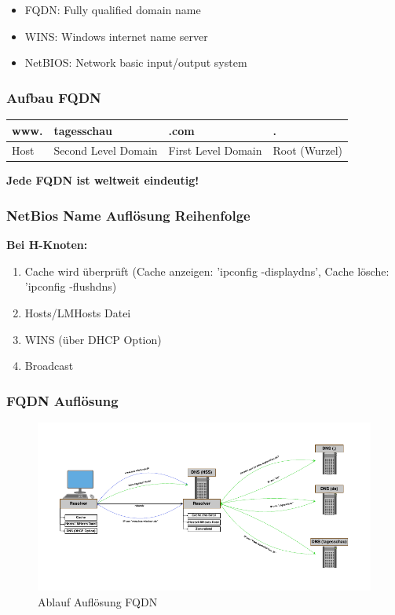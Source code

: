\documentclass[10pt]{article}
\begin{document}
\begin{itemize}
    \item FQDN: Fully qualified domain name
    \item WINS: Windows internet name server
    \item NetBIOS: Network basic input/output system
\end{itemize}

\subsubsection{Aufbau FQDN}

\begin{table}[H]
    \centering
    \begin{tabular}{|l|l|l|l|}
         \hline
         www.&tagesschau&.com&.\\\hline
         Host&Second Level Domain& First Level Domain & Root (Wurzel)\\\hline
    \end{tabular}
\end{table}

\textbf{Jede FQDN ist weltweit eindeutig!}

\subsubsection{NetBios Name Auflösung Reihenfolge}
\textbf{Bei H-Knoten:}
\begin{enumerate}
        \item Cache wird überprüft (Cache anzeigen: 'ipconfig -displaydns', Cache lösche: 'ipconfig -flushdns)
	\item Hosts/LMHosts Datei
	\item WINS (über DHCP Option)
        \item Broadcast
\end{enumerate}

\subsubsection{FQDN Auflösung}

\begin{figure}[H]
	\includegraphics[width=\textwidth]{fqdn.pdf}
	\caption{Ablauf Auflösung FQDN}
\end{figure}
\end{document}
